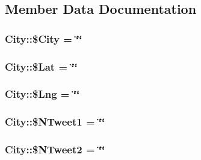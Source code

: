 \subsection{Member Data Documentation}
\subsubsection[{\texorpdfstring{\$\+City}{$City}}]{\setlength{\rightskip}{0pt plus 5cm}City\+::\$\+City = \char`\"{}\char`\"{}}\hypertarget{classCity_a37b890581b830d6dcb43dee2d8c98463}{}\label{classCity_a37b890581b830d6dcb43dee2d8c98463}
\subsubsection[{\texorpdfstring{\$\+Lat}{$Lat}}]{\setlength{\rightskip}{0pt plus 5cm}City\+::\$\+Lat = \char`\"{}\char`\"{}}\hypertarget{classCity_af2b3e408999c8ab317e80a107c543dc4}{}\label{classCity_af2b3e408999c8ab317e80a107c543dc4}
\subsubsection[{\texorpdfstring{\$\+Lng}{$Lng}}]{\setlength{\rightskip}{0pt plus 5cm}City\+::\$\+Lng = \char`\"{}\char`\"{}}\hypertarget{classCity_a8df2449cae23d59eff5e5fa2747155e6}{}\label{classCity_a8df2449cae23d59eff5e5fa2747155e6}
\subsubsection[{\texorpdfstring{\$\+N\+Tweet1}{$NTweet1}}]{\setlength{\rightskip}{0pt plus 5cm}City\+::\$\+N\+Tweet1 = \char`\"{}\char`\"{}}\hypertarget{classCity_af0ef76f4a336e0e471971cfdcc9a4da6}{}\label{classCity_af0ef76f4a336e0e471971cfdcc9a4da6}
\subsubsection[{\texorpdfstring{\$\+N\+Tweet2}{$NTweet2}}]{\setlength{\rightskip}{0pt plus 5cm}City\+::\$\+N\+Tweet2 = \char`\"{}\char`\"{}}\hypertarget{classCity_a91717a27f9d2f1c3243fe1388a1013f4}{}\label{classCity_a91717a27f9d2f1c3243fe1388a1013f4}
